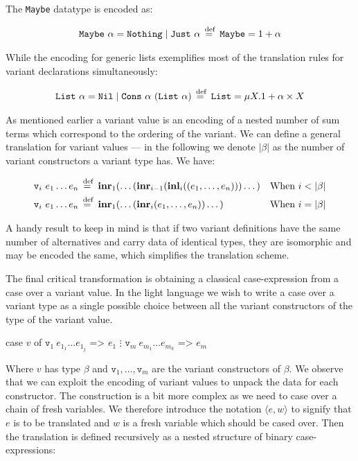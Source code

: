 The \texttt{Maybe} datatype is encoded as:

\begin{align*}
  \texttt{Maybe}~\alpha = \texttt{Nothing} \mid \texttt{Just}~\alpha \stackrel{\>\text{def}}{=}\>
  \texttt{Maybe} = 1 + \alpha
\end{align*}

While the encoding for generic lists exemplifies most of the translation rules
for variant declarations simultaneously:

\begin{align*}
  \texttt{List}~\alpha = \texttt{Nil} \mid \texttt{Cons}~\alpha~(\texttt{List}~\alpha)
  \stackrel{\>\text{def}}{=}\> \texttt{List} = \mu X . 1 + \alpha \times X
\end{align*}

As mentioned earlier a variant value is an encoding of a nested number of sum
terms which correspond to the ordering of the variant. We can define a general
translation for variant values --- in the following we denote $|\beta|$ as the
number of variant constructors a variant type has. We have:

\begin{align*}
  \texttt{v}_i~e_1 \dots e_n &\stackrel{\>\text{def}}{=}\>
    \textbf{inr}_1 (\dots (
    \textbf{inr}_{i-1} (
    \textbf{inl}_i ((e_1, \dots, e_n))) \dots )
    &\text{When $i < |\beta|$} \\
  \texttt{v}_i~e_1 \dots e_n &\stackrel{\>\text{def}}{=}\>
    \textbf{inr}_1 (\dots (
    \textbf{inr}_{i} (e_1, \dots, e_n)) \dots )
    &\text{When $i = |\beta|$} \\
\end{align*}

A handy result to keep in mind is that if two variant definitions have the same
number of alternatives and carry data of identical types, they are isomorphic
and may be encoded the same, which simplifies the translation scheme.

The final critical transformation is obtaining a classical case-expression from
a case over a variant value. In the light language we wish to write a case over
a variant type as a single possible choice between all the variant constructors
of the type of the variant value.

\begin{rfuncode}
  case $v$ of
    $\texttt{v}_1~e_{1_1} \dots e_{1_j}$ => $e_1$
           $\vdots$
    $\texttt{v}_m~e_{m_1} \dots e_{m_k}$ => $e_m$
\end{rfuncode}

Where $v$ has type $\beta$ and $\texttt{v}_1, \dots, \texttt{v}_m$ are the
variant constructors of $\beta$. We observe that we can exploit the encoding of
variant values to unpack the data for each constructor. The construction is a
bit more complex as we need to case over a chain of fresh variables. We
therefore introduce the notation $\langle e, w \rangle$ to signify that $e$ is
to be translated and $w$ is a fresh variable which should be cased over. Then the
translation is defined recursively as a nested structure of binary
case-expressions:

